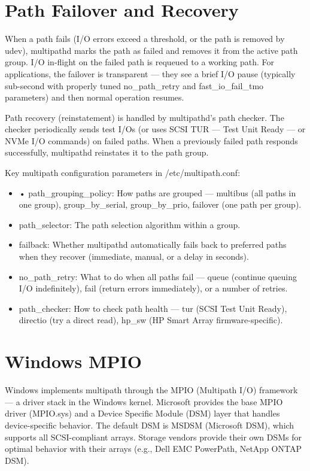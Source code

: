 \section{Path Failover and Recovery}
When a path fails (I/O errors exceed a threshold, or the path is removed by udev), multipathd marks the path as failed and removes it from the active path group. I/O in-flight on the failed path is requeued to a working path. For applications, the failover is transparent --- they see a brief I/O pause (typically sub-second with properly tuned no\_path\_retry and fast\_io\_fail\_tmo parameters) and then normal operation resumes.

Path recovery (reinstatement) is handled by multipathd's path checker. The checker periodically sends test I/Os (or uses SCSI TUR --- Test Unit Ready --- or NVMe I/O commands) on failed paths. When a previously failed path responds successfully, multipathd reinstates it to the path group.

Key multipath configuration parameters in /etc/multipath.conf:

\begin{itemize}
  \item • path\_grouping\_policy: How paths are grouped --- multibus (all paths in one group), group\_by\_serial, group\_by\_prio, failover (one path per group).
  \item path\_selector: The path selection algorithm within a group.
  \item failback: Whether multipathd automatically fails back to preferred paths when they recover (immediate, manual, or a delay in seconds).
  \item no\_path\_retry: What to do when all paths fail --- queue (continue queuing I/O indefinitely), fail (return errors immediately), or a number of retries.
  \item path\_checker: How to check path health --- tur (SCSI Test Unit Ready), directio (try a direct read), hp\_sw (HP Smart Array firmware-specific).
\end{itemize}

\section{Windows MPIO}
Windows implements multipath through the MPIO (Multipath I/O) framework --- a driver stack in the Windows kernel. Microsoft provides the base MPIO driver (MPIO.sys) and a Device Specific Module (DSM) layer that handles device-specific behavior. The default DSM is MSDSM (Microsoft DSM), which supports all SCSI-compliant arrays. Storage vendors provide their own DSMs for optimal behavior with their arrays (e.g., Dell EMC PowerPath, NetApp ONTAP DSM).

